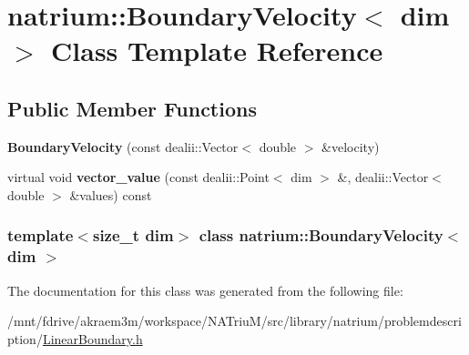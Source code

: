 \hypertarget{classnatrium_1_1BoundaryVelocity}{
\section{natrium::BoundaryVelocity$<$ dim $>$ Class Template Reference}
\label{classnatrium_1_1BoundaryVelocity}
}
\subsection*{Public Member Functions}
\begin{DoxyCompactItemize}
\item 
\hypertarget{classnatrium_1_1BoundaryVelocity_af1152b7fba47fb5756cd286e849e3587}{
{\bfseries BoundaryVelocity} (const dealii::Vector$<$ double $>$ \&velocity)}
\label{classnatrium_1_1BoundaryVelocity_af1152b7fba47fb5756cd286e849e3587}

\item 
\hypertarget{classnatrium_1_1BoundaryVelocity_ab47b247a35c5f6a7fcee9765a47e2f97}{
virtual void {\bfseries vector\_\-value} (const dealii::Point$<$ dim $>$ \&, dealii::Vector$<$ double $>$ \&values) const }
\label{classnatrium_1_1BoundaryVelocity_ab47b247a35c5f6a7fcee9765a47e2f97}

\end{DoxyCompactItemize}
\subsubsection*{template$<$size\_\-t dim$>$ class natrium::BoundaryVelocity$<$ dim $>$}



The documentation for this class was generated from the following file:\begin{DoxyCompactItemize}
\item 
/mnt/fdrive/akraem3m/workspace/NATriuM/src/library/natrium/problemdescription/\hyperlink{LinearBoundary_8h}{LinearBoundary.h}\end{DoxyCompactItemize}
